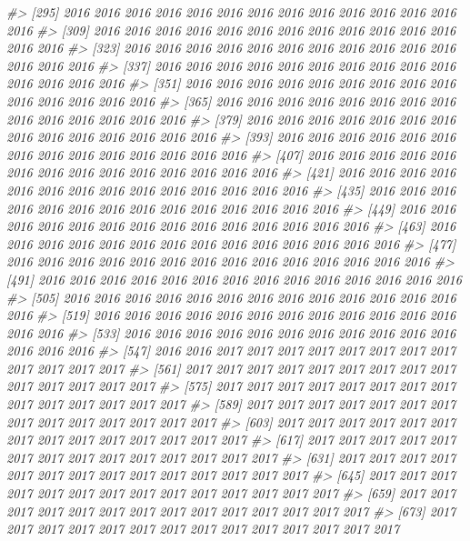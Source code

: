 \documentclass[
]{article}
\newenvironment{Shaded}{\begin{snugshade}}{\end{snugshade}}
\newcommand{\CommentTok}[1]{\textcolor[rgb]{0.56,0.35,0.01}{\textit{#1}}}
\begin{document}
\begin{Shaded}
\begin{Highlighting}[]
\CommentTok{#>  [295] 2016 2016 2016 2016 2016 2016 2016 2016 2016 2016 2016 2016 2016 2016}
\CommentTok{#>  [309] 2016 2016 2016 2016 2016 2016 2016 2016 2016 2016 2016 2016 2016 2016}
\CommentTok{#>  [323] 2016 2016 2016 2016 2016 2016 2016 2016 2016 2016 2016 2016 2016 2016}
\CommentTok{#>  [337] 2016 2016 2016 2016 2016 2016 2016 2016 2016 2016 2016 2016 2016 2016}
\CommentTok{#>  [351] 2016 2016 2016 2016 2016 2016 2016 2016 2016 2016 2016 2016 2016 2016}
\CommentTok{#>  [365] 2016 2016 2016 2016 2016 2016 2016 2016 2016 2016 2016 2016 2016 2016}
\CommentTok{#>  [379] 2016 2016 2016 2016 2016 2016 2016 2016 2016 2016 2016 2016 2016 2016}
\CommentTok{#>  [393] 2016 2016 2016 2016 2016 2016 2016 2016 2016 2016 2016 2016 2016 2016}
\CommentTok{#>  [407] 2016 2016 2016 2016 2016 2016 2016 2016 2016 2016 2016 2016 2016 2016}
\CommentTok{#>  [421] 2016 2016 2016 2016 2016 2016 2016 2016 2016 2016 2016 2016 2016 2016}
\CommentTok{#>  [435] 2016 2016 2016 2016 2016 2016 2016 2016 2016 2016 2016 2016 2016 2016}
\CommentTok{#>  [449] 2016 2016 2016 2016 2016 2016 2016 2016 2016 2016 2016 2016 2016 2016}
\CommentTok{#>  [463] 2016 2016 2016 2016 2016 2016 2016 2016 2016 2016 2016 2016 2016 2016}
\CommentTok{#>  [477] 2016 2016 2016 2016 2016 2016 2016 2016 2016 2016 2016 2016 2016 2016}
\CommentTok{#>  [491] 2016 2016 2016 2016 2016 2016 2016 2016 2016 2016 2016 2016 2016 2016}
\CommentTok{#>  [505] 2016 2016 2016 2016 2016 2016 2016 2016 2016 2016 2016 2016 2016 2016}
\CommentTok{#>  [519] 2016 2016 2016 2016 2016 2016 2016 2016 2016 2016 2016 2016 2016 2016}
\CommentTok{#>  [533] 2016 2016 2016 2016 2016 2016 2016 2016 2016 2016 2016 2016 2016 2016}
\CommentTok{#>  [547] 2016 2016 2017 2017 2017 2017 2017 2017 2017 2017 2017 2017 2017 2017}
\CommentTok{#>  [561] 2017 2017 2017 2017 2017 2017 2017 2017 2017 2017 2017 2017 2017 2017}
\CommentTok{#>  [575] 2017 2017 2017 2017 2017 2017 2017 2017 2017 2017 2017 2017 2017 2017}
\CommentTok{#>  [589] 2017 2017 2017 2017 2017 2017 2017 2017 2017 2017 2017 2017 2017 2017}
\CommentTok{#>  [603] 2017 2017 2017 2017 2017 2017 2017 2017 2017 2017 2017 2017 2017 2017}
\CommentTok{#>  [617] 2017 2017 2017 2017 2017 2017 2017 2017 2017 2017 2017 2017 2017 2017}
\CommentTok{#>  [631] 2017 2017 2017 2017 2017 2017 2017 2017 2017 2017 2017 2017 2017 2017}
\CommentTok{#>  [645] 2017 2017 2017 2017 2017 2017 2017 2017 2017 2017 2017 2017 2017 2017}
\CommentTok{#>  [659] 2017 2017 2017 2017 2017 2017 2017 2017 2017 2017 2017 2017 2017 2017}
\CommentTok{#>  [673] 2017 2017 2017 2017 2017 2017 2017 2017 2017 2017 2017 2017 2017 2017}

\end{Highlighting}
\end{Shaded}
\end{document}
